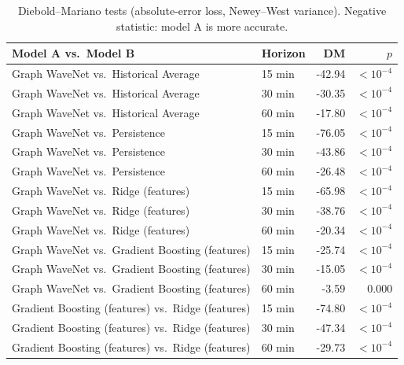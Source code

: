 \begin{table}[t]
\centering
\caption{Diebold--Mariano tests (absolute-error loss, Newey--West variance). Negative statistic: model A is more accurate.}
\label{tab:dm}
\setlength{\tabcolsep}{3pt}
\begin{tabular}{llrr}
\toprule
Model A vs.\ Model B & Horizon & DM & $p$ \\
\midrule
Graph WaveNet vs.\ Historical Average & 15 min & -42.94 & $<10^{-4}$ \\
Graph WaveNet vs.\ Historical Average & 30 min & -30.35 & $<10^{-4}$ \\
Graph WaveNet vs.\ Historical Average & 60 min & -17.80 & $<10^{-4}$ \\
Graph WaveNet vs.\ Persistence & 15 min & -76.05 & $<10^{-4}$ \\
Graph WaveNet vs.\ Persistence & 30 min & -43.86 & $<10^{-4}$ \\
Graph WaveNet vs.\ Persistence & 60 min & -26.48 & $<10^{-4}$ \\
Graph WaveNet vs.\ Ridge (features) & 15 min & -65.98 & $<10^{-4}$ \\
Graph WaveNet vs.\ Ridge (features) & 30 min & -38.76 & $<10^{-4}$ \\
Graph WaveNet vs.\ Ridge (features) & 60 min & -20.34 & $<10^{-4}$ \\
Graph WaveNet vs.\ Gradient Boosting (features) & 15 min & -25.74 & $<10^{-4}$ \\
Graph WaveNet vs.\ Gradient Boosting (features) & 30 min & -15.05 & $<10^{-4}$ \\
Graph WaveNet vs.\ Gradient Boosting (features) & 60 min & -3.59 & 0.000 \\
Gradient Boosting (features) vs.\ Ridge (features) & 15 min & -74.80 & $<10^{-4}$ \\
Gradient Boosting (features) vs.\ Ridge (features) & 30 min & -47.34 & $<10^{-4}$ \\
Gradient Boosting (features) vs.\ Ridge (features) & 60 min & -29.73 & $<10^{-4}$ \\
\bottomrule
\end{tabular}
\end{table}